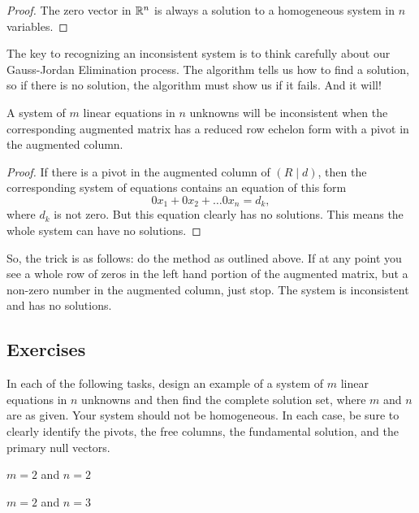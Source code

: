 \documentclass[elementsmain.tex]{subfiles}
\begin{document}
\begin{proof} The zero vector in $\mathbb{R}^n$ is always a solution to a homogeneous system in $n$ variables.
\end{proof}


The key to recognizing an inconsistent system is to think carefully about our Gauss-Jordan Elimination process. The algorithm tells us how to find a solution, so if there is no solution, the algorithm must show us if it fails. And it will! 

\begin{theorem}
A system of $m$ linear equations in $n$ unknowns will be inconsistent when the corresponding augmented matrix has a reduced row echelon form with a pivot in the augmented column.
\end{theorem}

\begin{proof}
If there is a pivot in the augmented column of $\left(R\mid d\right)$, then the corresponding system of equations contains an equation of this form
\[
0x_1 + 0x_2 + \dots 0x_n = d_k,
\]
where $d_k$ is not zero. But this equation clearly has no solutions. This means the whole system can have no solutions.
\end{proof}

So, the trick is as follows: do the method as outlined above. If at any point you see a whole row of zeros in the left hand portion of the augmented matrix, but a non-zero number in the augmented column, just stop. The system is inconsistent and has no solutions.

\clearpage

\subsection*{Exercises}

In each of the following tasks, design an example of a system of $m$ linear equations in $n$ unknowns and then find the complete solution set, where $m$ and $n$ are as given. Your system should not be homogeneous. In each case, be sure to clearly identify the pivots, the free columns, the fundamental solution, and the primary null vectors.

\begin{exercise} $m=2$ and $n=2$
\end{exercise}

\begin{exercise} $m=2$ and $n=3$
\end{exercise}
\end{document}
